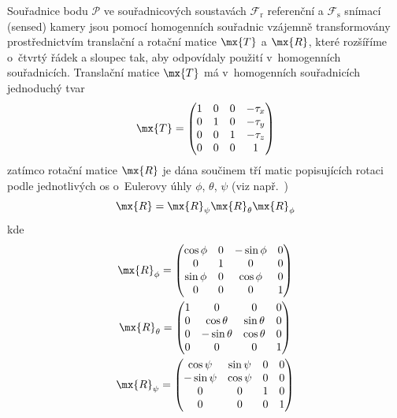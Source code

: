 Souřadnice bodu $\mathcal{P}$ ve  souřadnicových soustavách
$\mathcal{F}_{\mathrm{r}}$ referenční a $\mathcal{F}_{\mathrm{s}}$ snímací
(sensed) kamery jsou pomocí homogenních souřadnic vzájemně transformovány
prostřednictvím translační a rotační matice $\mx{T}$ a $\mx{R}$, které
rozšíříme o~čtvrtý řádek a sloupec tak, aby odpovídaly použití v~homogenních
souřadnicích. Translační matice $\mx{T}$ má v~homogenních souřadnicích
jednoduchý tvar
\begin{equation}
  \mx{T} =
  \begin{pmatrix}
    1&0&0&-\tau_{x}\\
    0&1&0&-\tau_{y}\\
    0&0&1&-\tau_{z}\\
    0&0&0&1
  \end{pmatrix}                                                  \label{EQtrans}
\end{equation}
zatímco rotační matice $\mx{R}$ je dána součinem tří matic popisujících rotaci
podle jednotlivých os o~Eulerovy úhly $\phi$, $\theta$, $\psi$ (viz
např.~\cite{Soj-Gau-Kru:2011:MatZaDiZpraSig:2,%
  Gol-Poo-Saf:2002:ClassMech:3})
\begin{equation}
  \mx{R} = \mx{R}_{\psi}\mx{R}_{\theta}\mx{R}_{\phi}                    \label{EQr3}
\end{equation}
kde
\begin{gather}
  \mx{R}_{\phi} =
  \begin{pmatrix}
    \cos\phi & 0 & -\sin\phi & 0\\
    0        & 1 & 0         & 0\\
    \sin\phi & 0 & \cos\phi  & 0\\
    0&0&0&1
  \end{pmatrix}                                                  \label{EQpan}\\
  \mx{R}_{\theta} =
  \begin{pmatrix}
    1 & 0           & 0          & 0\\
    0 & \cos\theta  & \sin\theta & 0\\
    0 & -\sin\theta & \cos\theta & 0\\
    0&0&0&1
  \end{pmatrix}                                                 \label{EQtilt}\\
  \mx{R}_{\psi} =
  \begin{pmatrix}
    \cos\psi  & \sin\psi & 0 & 0\\
    -\sin\psi & \cos\psi & 0 & 0\\
    0&0&1&0\\
    0&0&0&1
  \end{pmatrix}                                                   \label{EQroll}
\end{gather}

